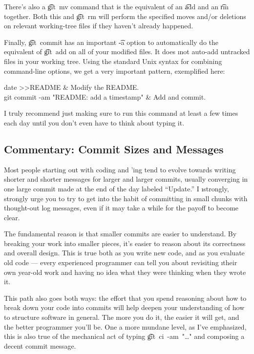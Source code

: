 \documentclass[letterpaper,12pt,titlepage,twoside]{article}
\begin{document}
There's also a \t{git~mv} command that is the equivalent of an \t{add} and an
\t{rm} together. Both this and \t{git~rm} will perform the specified moves
and/or deletions on relevant working-tree files if they haven't already
happened.

Finally, \t{git~commit} has an important \t{-a} option to automatically do the
equivalent of \t{git~add} on all of your modified files. It does \i{not}
auto-add untracked files in your working tree. Using the standard Unix syntax
for combining command-line options, we get a very important pattern,
exemplified here:

\begin{typeme}
date >>README & Modify the README. \\
git commit -am "README: add a timestamp" & Add and commit.
\end{typeme}

I truly recommend just making sure to run this command at least a few times
each day until you don't even have to think about typing it.

\subsection*{Commentary: Commit Sizes and Messages}

Most people starting out with coding and \git'ing tend to evolve towards
writing shorter and shorter messages for larger and larger commits, usually
converging in one large commit made at the end of the day labeled ``Update.''
I \i{strongly, strongly urge} you to try to get into the habit of committing
in small chunks with thought-out log messages, even if it may take a while for
the payoff to become clear.

The fundamental reason is that smaller commits are easier to understand. By
breaking your work into smaller pieces, it's easier to reason about its
correctness and overall design. This is true both as you write new code, and
as you evaluate old code --- every experienced programmer can tell you about
revisiting \i{their own} year-old work and having no idea what they were
thinking when they wrote it.

This path also goes both ways: the effort that you spend reasoning about how
to break down your code into commits will help deepen your understanding of
how to structure software in general. The more you do it, the easier it will
get, and the better programmer you'll be. One a more mundane level, as I've
emphasized, this is also true of the mechanical act of typing
\t{git~ci~-am~"\ldots"} and composing a decent commit message.
\end{document}
